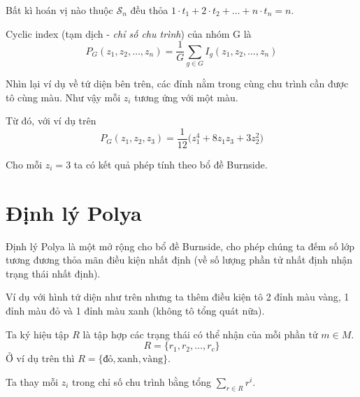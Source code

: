 \begin{remark}
    Bất kì hoán vị nào thuộc $\mathcal{S}_n$ đều thỏa $1 \cdot t_1 + 2 \cdot t_2 + \ldots + n \cdot t_n = n$.
\end{remark}

\begin{definition}{Cyclic index}
    (tạm dịch - \textit{chỉ số chu trình}) của nhóm G là
    \[P_G (z_1, z_2, \ldots, z_n) = \frac{1}{G}\sum_{g \in G} I_g (z_1, z_2, \ldots, z_n)\]
\end{definition}

Nhìn lại ví dụ về tứ diện bên trên, các đỉnh nằm trong cùng chu trình cần được tô cùng màu. Như vậy mỗi $z_i$ tương ứng với một màu.

Từ đó, với ví dụ trên
\[P_G(z_1, z_2, z_3) = \frac{1}{12}\big(z_1^4 + 8 z_1 z_3 + 3 z_2^2\big)\]

Cho mỗi $z_i = 3$ ta có kết quả phép tính theo bổ đề Burnside.

\section{Định lý Polya}

Định lý Polya là một mở rộng cho bổ đề Burnside, cho phép chúng ta đếm số lớp tương đương thỏa mãn điều kiện nhất định (về số lượng phần tử nhất định nhận trạng thái nhất định).

Ví dụ với hình tứ diện như trên nhưng ta thêm điều kiện tô 2 đỉnh màu vàng, 1 đỉnh màu đỏ và 1 đỉnh màu xanh (không tô tổng quát nữa).

Ta ký hiệu tập $R$ là tập hợp các trạng thái có thể nhận của mỗi phần tử $m \in M$.
\[R = \{r_1, r_2, \ldots, r_c \}\]
Ở ví dụ trên thì $R = \{\text{đỏ}, \text{xanh}, \text{vàng}\}$.

Ta thay mỗi $z_i$ trong chỉ số chu trình bằng tổng $\sum_{r \in R} r^i$.

